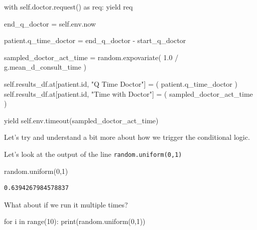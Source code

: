 \documentclass[
  letterpaper,
  DIV=11,
  numbers=noendperiod]{scrreprt}
\newenvironment{Shaded}{}{}
\newcommand{\BuiltInTok}[1]{\textcolor[rgb]{0.84,0.23,0.29}{#1}}
\newcommand{\ControlFlowTok}[1]{\textcolor[rgb]{0.84,0.23,0.29}{#1}}
\newcommand{\DecValTok}[1]{\textcolor[rgb]{0.00,0.36,0.77}{#1}}
\newcommand{\FloatTok}[1]{\textcolor[rgb]{0.00,0.36,0.77}{#1}}
\newcommand{\ImportTok}[1]{\textcolor[rgb]{0.01,0.18,0.38}{#1}}
\newcommand{\KeywordTok}[1]{\textcolor[rgb]{0.84,0.23,0.29}{#1}}
\newcommand{\NormalTok}[1]{\textcolor[rgb]{0.14,0.16,0.18}{#1}}
\newcommand{\OperatorTok}[1]{\textcolor[rgb]{0.14,0.16,0.18}{#1}}
\newcommand{\StringTok}[1]{\textcolor[rgb]{0.01,0.18,0.38}{#1}}
\newcommand{\VariableTok}[1]{\textcolor[rgb]{0.89,0.38,0.04}{#1}}
\begin{document}
\begin{Shaded}
\begin{Highlighting}[]
            \ControlFlowTok{with} \VariableTok{self}\NormalTok{.doctor.request() }\ImportTok{as}\NormalTok{ req:}
                \ControlFlowTok{yield}\NormalTok{ req}

\NormalTok{                end\_q\_doctor }\OperatorTok{=} \VariableTok{self}\NormalTok{.env.now}

\NormalTok{                patient.q\_time\_doctor }\OperatorTok{=}\NormalTok{ end\_q\_doctor }\OperatorTok{{-}}\NormalTok{ start\_q\_doctor}

\NormalTok{                sampled\_doctor\_act\_time }\OperatorTok{=}\NormalTok{ random.expovariate(}
                    \FloatTok{1.0} \OperatorTok{/}\NormalTok{ g.mean\_d\_consult\_time}
\NormalTok{                )}

                \VariableTok{self}\NormalTok{.results\_df.at[patient.}\BuiltInTok{id}\NormalTok{, }\StringTok{"Q Time Doctor"}\NormalTok{] }\OperatorTok{=}\NormalTok{ (}
\NormalTok{                    patient.q\_time\_doctor}
\NormalTok{                )}
                \VariableTok{self}\NormalTok{.results\_df.at[patient.}\BuiltInTok{id}\NormalTok{, }\StringTok{"Time with Doctor"}\NormalTok{] }\OperatorTok{=}\NormalTok{ (}
\NormalTok{                    sampled\_doctor\_act\_time}
\NormalTok{                )}

                \ControlFlowTok{yield} \VariableTok{self}\NormalTok{.env.timeout(sampled\_doctor\_act\_time)}
\end{Highlighting}
\end{Shaded}

Let's try and understand a bit more about how we trigger the conditional
logic.

Let's look at the output of the line \texttt{random.uniform(0,1)}

\begin{Shaded}
\begin{Highlighting}[]
\NormalTok{random.uniform(}\DecValTok{0}\NormalTok{,}\DecValTok{1}\NormalTok{)}
\end{Highlighting}
\end{Shaded}

\begin{verbatim}
0.6394267984578837
\end{verbatim}

What about if we run it multiple times?

\begin{Shaded}
\begin{Highlighting}[]
\ControlFlowTok{for}\NormalTok{ i }\KeywordTok{in} \BuiltInTok{range}\NormalTok{(}\DecValTok{10}\NormalTok{):}
  \BuiltInTok{print}\NormalTok{(random.uniform(}\DecValTok{0}\NormalTok{,}\DecValTok{1}\NormalTok{))}
\end{Highlighting}
\end{Shaded}
\end{document}
